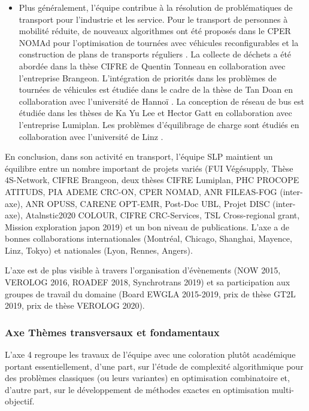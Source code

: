 \begin{itemize}
    \item Plus généralement, l'équipe contribue à la résolution de problématiques de transport pour l'industrie et les service. Pour le transport de personnes à mobilité réduite, de nouveaux algorithmes ont été proposés dans le CPER NOMAd pour l'optimisation de tournées avec véhicules reconfigurables \cite{tellez:hal-01768291} et la construction de plans de transports réguliers \cite{tellez:hal-02460670}.
    La collecte de déchets a été abordée dans la thèse CIFRE de Quentin Tonneau \cite{tonneau:hal-01621297, tonneau:tel-01729672} en collaboration avec l'entreprise Brangeon. 
    L'intégration de priorités dans les problèmes de  tournées de véhicules est étudiée dans le cadre de la thèse de Tan Doan en collaboration avec l'université de Hannoï \cite{}. 
    La conception de réseau de bus est étudiée dans les thèses de Ka Yu Lee \cite{lee:hal-01626949} et Hector Gatt en collaboration avec l'entreprise Lumiplan.
    Les problèmes d'équilibrage de charge sont étudiés en collaboration avec l'université de Linz \cite{lehuede:hal-02296076}.
\end{itemize}

En conclusion, dans son activité en transport, l'équipe SLP maintient un équilibre entre un nombre important de projets variés (FUI Végésupply, Thèse 4S-Network, CIFRE Brangeon, deux thèses CIFRE Lumiplan, PHC PROCOPE ATITUDS, PIA ADEME CRC-ON, CPER NOMAD, ANR FILEAS-FOG (inter-axe), ANR OPUSS, CARENE OPT-EMR, Post-Doc UBL, Projet DISC (inter-axe), Atalnstic2020 COLOUR, CIFRE CRC-Services, TSL Cross-regional grant, Mission exploration japon 2019) et un bon niveau de publications. 
L'axe a de bonnes collaborations internationales (Montréal, Chicago, Shanghai, Mayence, Linz, Tokyo) et nationales (Lyon, Rennes, Angers). 

L'axe est de plus visible à travers l'organisation d'évènements (NOW 2015, VEROLOG 2016, ROADEF 2018, Synchrotrans 2019) et sa participation aux groupes de travail du domaine (Board EWGLA 2015-2019, prix de thèse GT2L 2019, prix de thèse VEROLOG 2020).

\subsubsection{Axe Thèmes transversaux et fondamentaux}
  
L'axe 4 regroupe les travaux de l'équipe avec une coloration plutôt académique portant essentiellement, d'une part, sur l'étude de complexité algorithmique pour des problèmes classiques (ou leurs variantes) en optimisation combinatoire et, d'autre part, sur le développement de méthodes exactes en optimisation multi-objectif.      


